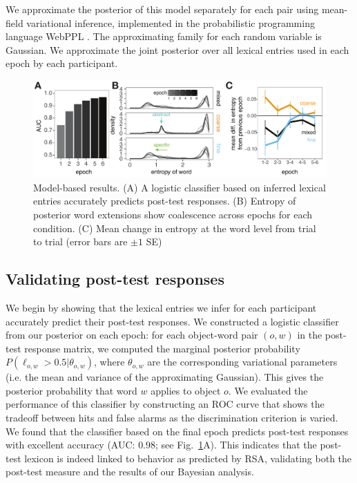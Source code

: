 We approximate the posterior of this model separately for each pair using mean-field variational inference, implemented in the probabilistic programming language WebPPL \cite{GoodmanStuhlmuller14_DIPPL,DAIPP}. 
The approximating family for each random variable is Gaussian. We approximate the joint posterior over all lexical entries used in each epoch by each participant. 


\begin{figure}[t]
\begin{center}
\includegraphics[scale=0.7]{./figures/sec2-modelFig.pdf}
\vspace{-1ex}
{\caption{{Model-based results. (A) A logistic classifier based on inferred lexical entries accurately predicts post-test responses. (B) Entropy of posterior word extensions show coalescence across epochs for each condition. (C) Mean change in entropy at the word level from trial to trial (error bars are $\pm 1$ SE)}  \label{fig:postTestPrediction}}}
\end{center}
\vspace{-3ex}
\end{figure}


\subsection{Validating post-test responses}

We begin by showing that the lexical entries we infer for each participant accurately predict their post-test responses. 
We constructed a logistic classifier from our posterior on each epoch: for each object-word pair $(o,w)$ in the post-test response matrix, we computed the marginal posterior probability $P(\ell_{o,w} > 0.5| \theta_{o,w})$, where $\theta_{o,w}$ are the corresponding variational parameters (i.e. the mean and variance of the approximating Gaussian). This gives the posterior probability that word $w$ applies to object $o$. We evaluated the performance of this classifier by constructing an ROC curve that shows the tradeoff between hits and false alarms as the discrimination criterion is varied. We found that the classifier based on the final epoch predicts post-test responses with excellent accuracy (AUC: $0.98$; see Fig.\ \ref{fig:postTestPrediction}A). This indicates that the post-test lexicon is indeed linked to behavior as predicted by RSA, validating both the post-test measure and the results of our Bayesian analysis.

